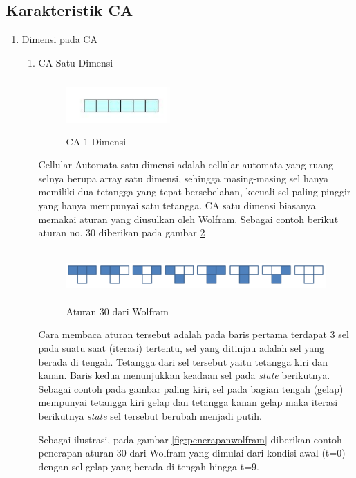 \subsection{Karakteristik CA}
\begin{enumerate}
	\item Dimensi pada CA
		\begin{enumerate}
			\item CA Satu Dimensi
			
				\begin{figure} [H]
					\centering  
					\includegraphics[width=4cm, height=2cm]{CA1D} 
					\caption[CA 1 Dimensi]{CA 1 Dimensi} 
					\label{fig:CA1D} 
				\end{figure}
			
			Cellular Automata satu dimensi adalah cellular automata yang ruang selnya berupa array satu dimensi, sehingga masing-masing sel hanya memiliki dua tetangga yang tepat bersebelahan, kecuali sel paling pinggir yang hanya mempunyai satu tetangga. CA satu dimensi biasanya memakai aturan yang diusulkan oleh Wolfram. Sebagai contoh berikut aturan no. 30 diberikan pada gambar \ref{fig:wolfram}
			
			
			\begin{figure} [H]
					\centering  
					\includegraphics[width=10cm, height=2cm]{wolfram} 
					\caption[Aturan 30 dari Wolfram]{Aturan 30 dari Wolfram} 
					\label{fig:wolfram} 
				\end{figure}
				
				Cara membaca aturan tersebut adalah pada baris pertama terdapat 3 sel pada suatu saat (iterasi) tertentu, sel yang ditinjau adalah sel yang berada di tengah. Tetangga dari sel tersebut yaitu tetangga kiri dan kanan. Baris kedua menunjukkan keadaan sel pada \textit{state} berikutnya. Sebagai contoh pada gambar paling kiri, sel pada bagian tengah (gelap) mempunyai tetangga kiri gelap dan tetangga kanan gelap maka iterasi berikutnya \textit{state} sel tersebut berubah menjadi putih.
				
				Sebagai ilustrasi, pada gambar \ref{fig:penerapanwolfram} diberikan contoh penerapan aturan 30 dari Wolfram yang dimulai dari kondisi awal (t=0) dengan sel gelap yang berada di tengah hingga t=9. \cite{ECA}
				

\end{enumerate}
\end{enumerate}
